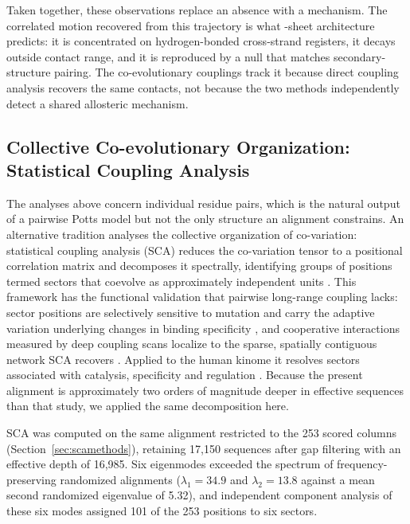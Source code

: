 \documentclass[utf8]{FrontiersinHarvard}
\begin{document}
Taken together, these observations replace an absence with a mechanism. The correlated motion recovered from this trajectory is what \textbeta{}-sheet architecture predicts: it is concentrated on hydrogen-bonded cross-strand registers, it decays outside contact range, and it is reproduced by a null that matches secondary-structure pairing. The co-evolutionary couplings track it because direct coupling analysis recovers the same contacts, not because the two methods independently detect a shared allosteric mechanism.

\subsection{Collective Co-evolutionary Organization: Statistical Coupling Analysis}
\label{sec:sca}

The analyses above concern individual residue pairs, which is the natural output of a pairwise Potts model but not the only structure an alignment constrains. An alternative tradition analyses the collective organization of co-variation: statistical coupling analysis (SCA) reduces the co-variation tensor to a positional correlation matrix and decomposes it spectrally, identifying groups of positions termed sectors that coevolve as approximately independent units \citep{Lockless1999,Halabi2009,Rivoire2016}. This framework has the functional validation that pairwise long-range coupling lacks: sector positions are selectively sensitive to mutation and carry the adaptive variation underlying changes in binding specificity \citep{McLaughlin2012}, and cooperative interactions measured by deep coupling scans localize to the sparse, spatially contiguous network SCA recovers \citep{Salinas2018}. Applied to the human kinome it resolves sectors associated with catalysis, specificity and regulation \citep{Creixell2018}. Because the present alignment is approximately two orders of magnitude deeper in effective sequences than that study, we applied the same decomposition here.

SCA was computed on the same alignment restricted to the 253 scored columns (Section~\ref{sec:scamethods}), retaining 17,150 sequences after gap filtering with an effective depth of 16,985. Six eigenmodes exceeded the spectrum of frequency-preserving randomized alignments ($\lambda_1 = 34.9$ and $\lambda_2 = 13.8$ against a mean second randomized eigenvalue of 5.32), and independent component analysis of these six modes assigned 101 of the 253 positions to six sectors.
\end{document}
